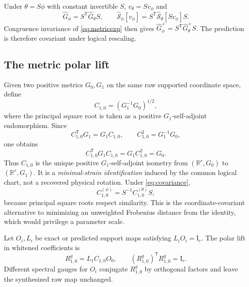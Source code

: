 \documentclass[10pt,twocolumn]{article}
\theoremstyle{definition}
\theoremstyle{remark}
\newcommand{\R}{\mathbb R}
\newcommand{\Id}{\mathrm I}
\begin{document}
Under $\theta=S\phi$ with constant invertible $S$, $v_\theta=Sv_\phi$ and
\begin{equation}
 \widehat G_\phi=S^{\mathsf T}\widehat G_\theta S,\qquad
 \widehat{\mathcal S}_{\phi}[v_\phi]
 =S^{\mathsf T}\widehat{\mathcal S}_{\theta}[Sv_\phi]S.
 \label{eq:straincovariance}
\end{equation}
Congruence invariance of \eqref{eq:metricexp} then gives $\widehat G_\phi^+=S^{\mathsf T}\widehat G_\theta^+S$.  The prediction is therefore covariant under logical rescaling.

\subsection{The metric polar lift}

Given two positive metrics $G_0,G_1$ on the same raw supported coordinate space, define
\begin{equation}
 C_{1,0}=(G_1^{-1}G_0)^{1/2},
 \label{eq:metricpolar}
\end{equation}
where the principal square root is taken as a positive $G_1$-self-adjoint endomorphism.  Since
\begin{equation}
 C_{1,0}^{\mathsf T}G_1=G_1C_{1,0},\qquad C_{1,0}^2=G_1^{-1}G_0,
 \label{eq:selfadjoint}
\end{equation}
one obtains
\begin{equation}
 C_{1,0}^{\mathsf T}G_1C_{1,0}=G_1C_{1,0}^2=G_0.
 \label{eq:polarisometry}
\end{equation}
Thus $C_{1,0}$ is the unique positive $G_1$-self-adjoint isometry from $(\R^r,G_0)$ to $(\R^r,G_1)$.  It is a \emph{minimal-strain identification} induced by the common logical chart, not a recovered physical rotation.  Under \eqref{eq:covariance},
\begin{equation}
 C_{1,0}^{(\phi)}=S^{-1}C_{1,0}^{(\theta)}S,
 \label{eq:polarcovariance}
\end{equation}
because principal square roots respect similarity.  This is the coordinate-covariant alternative to minimizing an unweighted Frobenius distance from the identity, which would privilege a parameter scale.

Let $O_i,L_i$ be exact or predicted support maps satisfying $L_iO_i=\Id_r$.  The polar lift in whitened coefficients is
\begin{equation}
 R^g_{1,0}=L_1C_{1,0}O_0,\qquad (R^g_{1,0})^{\mathsf T}R^g_{1,0}=\Id_r.
 \label{eq:polarcoeff}
\end{equation}
Different spectral gauges for $O_i$ conjugate $R^g_{1,0}$ by orthogonal factors and leave the synthesized raw map unchanged.
\end{document}
